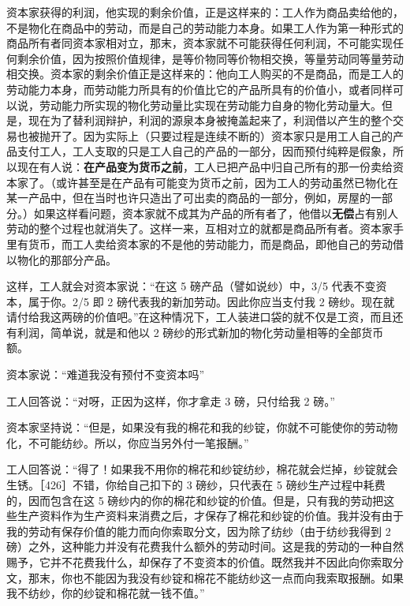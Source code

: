 资本家获得的利润，他实现的剩余价值，正是这样来的：工人作为商品卖给他的，不是物化在商品中的劳动，而是自己的劳动能力本身。如果工人作为第一种形式的商品所有者同资本家相对立，那末，资本家就不可能获得任何利润，不可能实现任何剩余价值，因为按照价值规律，是等价物同等价物相交换，等量劳动同等量劳动相交换。资本家的剩余价值正是这样来的：他向工人购买的不是商品，而是工人的劳动能力本身，而劳动能力所具有的价值比它的产品所具有的价值小，或者同样可以说，劳动能力所实现的物化劳动量比实现在劳动能力自身的物化劳动量大。但是，现在为了替利润辩护，利润的源泉本身被掩盖起来了，利润借以产生的整个交易也被抛开了。因为实际上（只要过程是连续不断的）资本家只是用工人自己的产品支付工人，工人支取的只是工人自己的产品的一部分，因而预付纯粹是假象，所以现在有人说：\textbf{在产品变为货币之前}，工人已把产品中归自己所有的那一份卖给资本家了。（或许甚至是在产品有可能变为货币之前，因为工人的劳动虽然已物化在某一产品中，但在当时也许只造出了可出卖的商品的一部分，例如，房屋的一部分。）如果这样看问题，资本家就不成其为产品的所有者了，他借以\textbf{无偿}占有别人劳动的整个过程也就消失了。这样一来，互相对立的就都是商品所有者。资本家手里有货币，而工人卖给资本家的不是他的劳动能力，而是商品，即他自己的劳动借以物化的那部分产品。

这样，工人就会对资本家说：“在这 5 磅产品（譬如说纱）中，3/5 代表不变资本，属于你。2/5 即 2 磅代表我的新加劳动。因此你应当支付我 2 磅纱。现在就请付给我这两磅的价值吧。”在这种情况下，工人装进口袋的就不仅是工资，而且还有利润，简单说，就是和他以 2 磅纱的形式新加的物化劳动量相等的全部货币额。

资本家说：“难道我没有预付不变资本吗”

工人回答说：“对呀，正因为这样，你才拿走 3 磅，只付给我 2 磅。”

资本家坚持说：“但是，如果没有我的棉花和我的纱锭，你就不可能使你的劳动物化，不可能纺纱。所以，你应当另外付一笔报酬。”

工人回答说：“得了！如果我不用你的棉花和纱锭纺纱，棉花就会烂掉，纱锭就会生锈。［426］不错，你给自己扣下的 3 磅纱，只代表在 5 磅纱生产过程中耗费的，因而包含在这 5 磅纱内的你的棉花和纱锭的价值。但是，只有我的劳动把这些生产资料作为生产资料来消费之后，才保存了棉花和纱锭的价值。我并没有由于我的劳动有保存价值的能力而向你索取分文，因为除了纺纱（由于纺纱我得到 2 磅）之外，这种能力并没有花费我什么额外的劳动时间。这是我的劳动的一种自然赐予，它并不花费我什么，却保存了不变资本的价值。既然我并不因此向你索取分文，那末，你也不能因为我没有纱锭和棉花不能纺纱这一点而向我索取报酬。如果我不纺纱，你的纱锭和棉花就一钱不值。”

